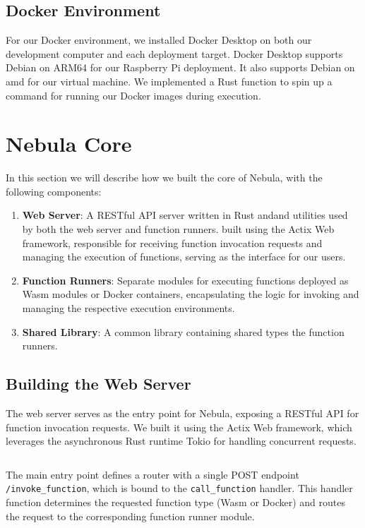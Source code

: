 \documentclass[
  table]{report}
\begin{document}
\subsection{Docker Environment}

For our Docker environment, we installed Docker Desktop on both our
development computer and each deployment target. Docker Desktop supports
Debian on ARM64 for our Raspberry Pi deployment. It also supports Debian
on amd for our virtual machine. We implemented a Rust function to spin
up a command for running our Docker images during execution.

\section{Nebula Core}

In this section we will describe how we built the core of Nebula, with
the following components:

\begin{enumerate}
\def\labelenumi{\arabic{enumi}.}
\item
  \textbf{Web Server}: A RESTful API server written in Rust andand
  utilities used by both the web server and function runners. built
  using the Actix Web framework, responsible for receiving function
  invocation requests and managing the execution of functions, serving
  as the interface for our users.
\item
  \textbf{Function Runners}: Separate modules for executing functions
  deployed as Wasm modules or Docker containers, encapsulating the logic
  for invoking and managing the respective execution environments.
\item
  \textbf{Shared Library}: A common library containing shared types the
  function runners.
\end{enumerate}

\subsection{Building the Web Server}

The web server serves as the entry point for Nebula, exposing a RESTful
API for function invocation requests. We built it using the Actix Web
framework, which leverages the asynchronous Rust runtime Tokio for
handling concurrent requests.

\inputminted{rust}{assets/code/web_server.rs}

The main entry point defines a router with a single POST endpoint
\texttt{/invoke\_function}, which is bound to the
\texttt{call\_function} handler. This handler function determines the
requested function type (Wasm or Docker) and routes the request to the
corresponding function runner module.
\end{document}
